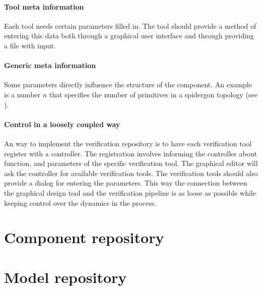 \paragraph{Tool meta information} Each tool needs certain parameters 
filled in. The tool should provide a method of entering this data 
both through a graphical user interface and through providing a 
file with input.

\paragraph{Generic meta information} Some parameters directly influence 
the structure of the component. An example is a number $n$ that
specifies the number of primitives in a spidergon topology (see \cite{chatterjee-kishinevsky:xmas}).

\paragraph{Control in a loosely coupled way} An way to implement 
the verification repository is to have each verification tool register 
with a controller. The registration involves informing the controller
about function, and parameters of the specific verification tool. 
The graphical editor will ask the controller for available 
verification tools. The verification tools should also provide
a dialog for entering the parameters. This way the connection between 
the graphical design tool and the verification pipeline is as loose 
as possible while keeping control over the dynamics in the process.


\section{Component repository}


\section{Model repository}


